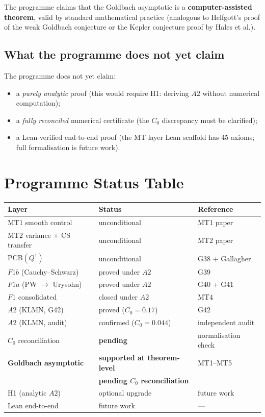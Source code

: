 \documentclass[11pt,a4paper]{article}
\begin{document}
The programme claims that the Goldbach asymptotic is a \textbf{computer-assisted theorem}, valid by standard mathematical practice (analogous to Helfgott's proof of the weak Goldbach conjecture or the Kepler conjecture proof by Hales et al.).

\subsection{What the programme does not yet claim}

The programme does not yet claim:
\begin{itemize}[nosep]
    \item a \emph{purely analytic} proof (this would require H1: deriving $A2$ without numerical computation);
    \item a \emph{fully reconciled} numerical certificate (the $C_0$ discrepancy must be clarified);
    \item a Lean-verified end-to-end proof (the MT-layer Lean scaffold has 45 axioms; full formalisation is future work).
\end{itemize}

\section{Programme Status Table}

\begin{center}
\begin{tabular}{@{}lll@{}}
\toprule
\textbf{Layer} & \textbf{Status} & \textbf{Reference} \\
\midrule
MT1 smooth control & unconditional & MT1 paper \\
MT2 variance + CS transfer & unconditional & MT2 paper \\
PCB$(Q^1)$ & unconditional & G38 + Gallagher \\
$F1b$ (Cauchy--Schwarz) & proved under $A2$ & G39 \\
$F1a$ (PW $\to$ Urysohn) & proved under $A2$ & G40 + G41 \\
$F1$ consolidated & closed under $A2$ & MT4 \\
$A2$ (KLMN, G42) & proved ($C_0=0.17$) & G42 \\
$A2$ (KLMN, audit) & confirmed ($C_0=0.044$) & independent audit \\
$C_0$ reconciliation & \textbf{pending} & normalisation check \\
\midrule
\textbf{Goldbach asymptotic} & \textbf{supported at theorem-level} & MT1--MT5 \\
& \textbf{pending $C_0$ reconciliation} & \\
\midrule
H1 (analytic $A2$) & optional upgrade & future work \\
Lean end-to-end & future work & --- \\
\bottomrule
\end{tabular}
\end{center}
\end{document}
